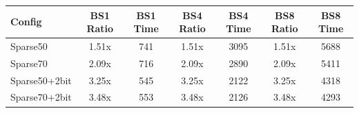 \begin{tabular}{lcccccc}
    \toprule
    Config & BS1 Ratio & BS1 Time & BS4 Ratio & BS4 Time & BS8 Ratio & BS8 Time \\
    \midrule
    Sparse50 & 1.51x & 741 & 1.51x & 3095 & 1.51x & 5688 \\
    Sparse70 & 2.09x & 716 & 2.09x & 2890 & 2.09x & 5411 \\
    Sparse50+2bit & 3.25x & 545 & 3.25x & 2122 & 3.25x & 4318 \\
    Sparse70+2bit & 3.48x & 553 & 3.48x & 2126 & 3.48x & 4293 \\
    \bottomrule
\end{tabular}
